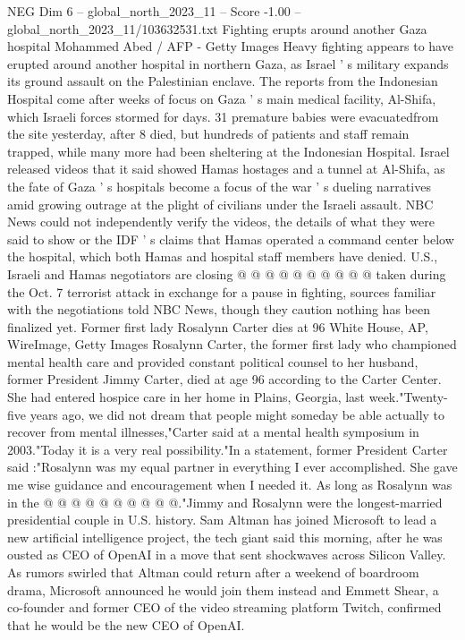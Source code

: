 \begin{textsample}{NEG Dim 6 – global\_north\_2023\_11 – Score -1.00 – global\_north\_2023\_11/103632531.txt}  \label{ex:f6_neg_230}
Fighting erupts around another Gaza hospital Mohammed Abed / AFP - Getty Images Heavy fighting appears to have erupted around another hospital in northern Gaza, as Israel ' s military expands its ground assault on the Palestinian enclave.
The reports from the Indonesian Hospital come after weeks of focus on Gaza ' s main medical facility, Al-Shifa, which Israeli forces stormed for days. 31 premature babies were evacuatedfrom the site yesterday, after 8 died, but hundreds of patients and staff remain trapped, while many more had been sheltering at the Indonesian Hospital.
Israel released videos that it said showed Hamas hostages and a tunnel at Al-Shifa, as the fate of Gaza ' s hospitals become a focus of the war ' s dueling narratives amid growing outrage at the plight of civilians under the Israeli assault.
NBC News could not independently verify the videos, the details of what they were said to show or the IDF ' s claims that Hamas operated a command center below the hospital, which both Hamas and hospital staff members have denied.
U.S., Israeli and Hamas negotiators are closing @ @ @ @ @ @ @ @ @ @ taken during the Oct. 7 terrorist attack in exchange for a pause in fighting, sources familiar with the negotiations told NBC News, though they caution nothing has been finalized yet.
Former first lady Rosalynn Carter dies at 96 White House, AP, WireImage, Getty Images Rosalynn Carter, the former first lady who championed mental health care and provided constant political counsel to her husband, former President Jimmy Carter, died at age 96 according to the Carter Center.
She had entered hospice care in her home in Plains, Georgia, last week."Twenty-five years ago, we did not dream that people might someday be able actually to recover from mental illnesses,"Carter said at a mental health symposium in 2003."Today it is a very real possibility."In a statement, former President Carter said :"Rosalynn was my equal partner in everything I ever accomplished.
She gave me wise guidance and encouragement when I needed it.
As long as Rosalynn was in the @ @ @ @ @ @ @ @ @ @."Jimmy and Rosalynn were the longest-married presidential couple in U.S. history.
Sam Altman has joined Microsoft to lead a new artificial intelligence project, the tech giant said this morning, after he was ousted as CEO of OpenAI in a move that sent shockwaves across Silicon Valley.
As rumors swirled that Altman could return after a weekend of boardroom drama, Microsoft announced he would join them instead and Emmett Shear, a co-founder and former CEO of the video streaming platform Twitch, confirmed that he would be the new CEO of OpenAI.

\end{textsample}
